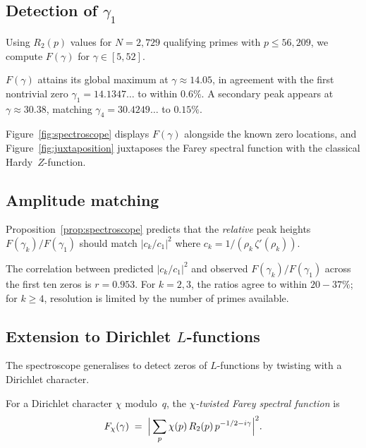 \subsection{Detection of $\gamma_1$}

Using $R_2(p)$ values for $N=2{,}729$ qualifying primes with $p\le56{,}209$,
we compute $F(\gamma)$ for $\gamma\in[5,52]$.

\begin{observation}\label{obs:gamma1}
$F(\gamma)$ attains its global maximum at $\gamma\approx 14.05$,
in agreement with the first nontrivial zero $\gamma_1=14.1347\ldots$
to within $0.6\%$.  A secondary peak appears at
$\gamma\approx 30.38$, matching $\gamma_4=30.4249\ldots$ to
$0.15\%$.
\end{observation}

Figure~\ref{fig:spectroscope} displays $F(\gamma)$ alongside the
known zero locations, and Figure~\ref{fig:juxtaposition} juxtaposes
the Farey spectral function with the classical Hardy~$Z$-function.

\subsection{Amplitude matching}

Proposition~\ref{prop:spectroscope} predicts that the \emph{relative}
peak heights $F(\gamma_k)/F(\gamma_1)$ should match
$|c_k/c_1|^2$ where $c_k = 1/(\rho_k\,\zeta'(\rho_k))$.

\begin{observation}\label{obs:amplitudes}
The correlation between predicted $|c_k/c_1|^2$ and observed
$F(\gamma_k)/F(\gamma_1)$ across the first ten zeros is
$r = 0.953$.  For $k=2{,}3$, the ratios agree to within $20{-}37\%$;
for $k\ge4$, resolution is limited by the number of primes available.
\end{observation}

\subsection{Extension to Dirichlet $L$-functions}

The spectroscope generalises to detect zeros of $L$-functions by
twisting with a Dirichlet character.

\begin{definition}\label{def:twisted}
For a Dirichlet character $\chi$ modulo~$q$, the \emph{$\chi$-twisted
Farey spectral function} is
\[
  F_\chi(\gamma) \;=\; \Bigl|\,\sum_{p} \chi(p)\,R_2(p)\,p^{-1/2-i\gamma}\Bigr|^2.
\]
\end{definition}

